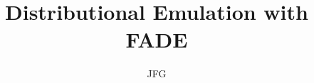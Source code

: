 \documentclass{article}
\title{Distributional Emulation with \scshape{FADE}}
\author{JFG}
\newcommand\addsection[1]
{
	
}
\begin{document}
	\maketitle
	\addsection{motivation}

	\addsection{data}
	\addsection{model}



	\addsection{priors}
	\addsection{posterior_predictive}

	\addsection{duals}
\end{document}
